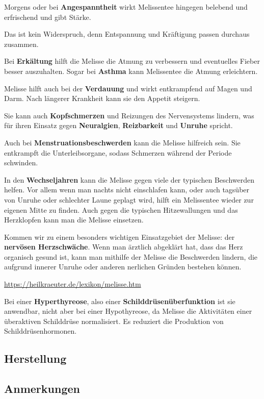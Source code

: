 Morgens oder bei \textbf{Angespanntheit} wirkt Melissentee hingegen belebend und erfrischend und gibt Stärke.

Das ist kein Widerspruch, denn Entspannung und Kräftigung passen durchaus zusammen.

Bei \textbf{Erkältung} hilft die Melisse die Atmung zu verbessern und eventuelles Fieber besser auszuhalten. Sogar bei \textbf{Asthma} kann Melissentee die Atmung erleichtern.

Melisse hilft auch bei der \textbf{Verdauung} und wirkt entkrampfend auf Magen und Darm. Nach längerer Krankheit kann sie den Appetit steigern.

Sie kann auch \textbf{Kopfschmerzen} und Reizungen des Nervensystems lindern, was für ihren Einsatz gegen \textbf{Neuralgien}, \textbf{Reizbarkeit} und \textbf{Unruhe} spricht.

Auch bei \textbf{Menstruationsbeschwerden} kann die Melisse hilfreich sein. Sie entkrampft die Unterleibsorgane, sodass Schmerzen während der Periode schwinden.

In den \textbf{Wechseljahren} kann die Melisse gegen viele der typischen Beschwerden helfen. Vor allem wenn man nachts nicht einschlafen kann, oder auch tagsüber von Unruhe oder schlechter Laune geplagt wird, hilft ein Melissentee wieder zur eigenen Mitte zu finden. Auch gegen die typischen Hitzewallungen und das Herzklopfen kann man die Melisse einsetzen.

Kommen wir zu einem besonders wichtigen Einsatzgebiet der Melisse: der \textbf{nervösen Herzschwäche}. Wenn man ärztlich abgeklärt hat, dass das Herz organisch gesund ist, kann man mithilfe der Melisse die Beschwerden lindern, die aufgrund innerer Unruhe oder anderen nerlichen Gründen bestehen können.

\cite{heilkraeuterlexikon}  \url{https://heilkraeuter.de/lexikon/melisse.htm}

Bei einer \textbf{Hyperthyreose}, also einer \textbf{Schilddrüsenüberfunktion} ist sie anwendbar, nicht aber bei einer Hypothyreose, da Melisse die Aktivitäten einer überaktiven Schilddrüse normalisiert. Es reduziert die Produktion von Schilddrüsenhormonen.

\subsection{Herstellung}

\subsection{Anmerkungen}
